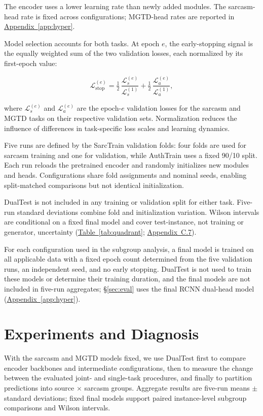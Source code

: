 \documentclass[11pt]{article}
\newcommand{\Sref}[1]{\hyperref[#1]{\S\ref*{#1}}}
\newcommand{\Appref}[1]{\hyperref[#1]{Appendix~\ref*{#1}}}
\newcommand{\Tabref}[1]{\hyperref[#1]{Table~\ref*{#1}}}
\begin{document}
The encoder uses a lower learning rate than newly added modules. The sarcasm-head rate is fixed across configurations; MGTD-head rates are reported in \Appref{app:hyper}.

Model selection accounts for both tasks. At epoch $e$, the early-stopping signal is the equally weighted sum of the two validation losses, each normalized by its first-epoch value:

\begin{equation}
\label{eq:stop}
\mathcal{L}_{\mathrm{stop}}^{(e)}=\tfrac{1}{2}\,\frac{\mathcal{L}_{s}^{(e)}}{\mathcal{L}_{s}^{(1)}}+\tfrac{1}{2}\,\frac{\mathcal{L}_{a}^{(e)}}{\mathcal{L}_{a}^{(1)}},
\end{equation}

where $\mathcal{L}_{s}^{(e)}$ and $\mathcal{L}_{a}^{(e)}$ are the epoch-$e$ validation losses for the sarcasm and MGTD tasks on their respective validation sets. Normalization reduces the influence of differences in task-specific loss scales and learning dynamics.

Five runs are defined by the SarcTrain validation folds: four folds are used for sarcasm training and one for validation, while AuthTrain uses a fixed 90/10 split. Each run reloads the pretrained encoder and randomly initializes new modules and heads. Configurations share fold assignments and nominal seeds, enabling split-matched comparisons but not identical initialization.

DualTest is not included in any training or validation split for either task. Five-run standard deviations combine fold and initialization variation. Wilson intervals are conditional on a fixed final model and cover test-instance, not training or generator, uncertainty (\Tabref{tab:quadrant}; \hyperref[app:c7]{Appendix~C.7}).

For each configuration used in the subgroup analysis, a final model is trained on all applicable data with a fixed epoch count determined from the five validation runs, an independent seed, and no early stopping. DualTest is not used to train these models or determine their training duration, and the final models are not included in five-run aggregates; \Sref{sec:eval} uses the final RCNN dual-head model (\Appref{app:hyper}).

\section{Experiments and Diagnosis}
\label{sec:exp}

With the sarcasm and MGTD models fixed, we use DualTest first to compare encoder backbones and intermediate configurations, then to measure the change between the evaluated joint- and single-task procedures, and finally to partition predictions into source $\times$ sarcasm groups. Aggregate results are five-run means $\pm$ standard deviations; fixed final models support paired instance-level subgroup comparisons and Wilson intervals.
\end{document}
